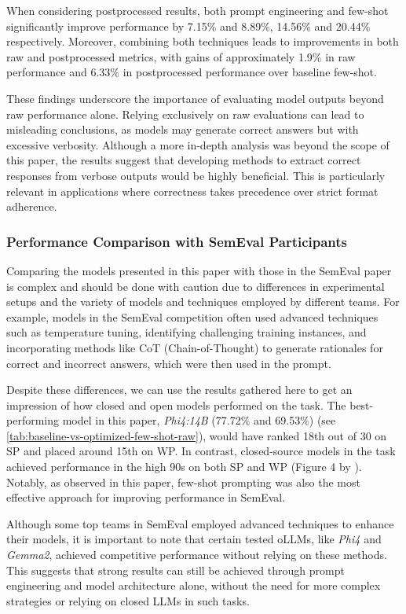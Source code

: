 When considering postprocessed results, both prompt engineering and few-shot significantly improve performance by 7.15\% and 8.89\%, 14.56\% and 20.44\% respectively. Moreover, combining both techniques leads to improvements in both raw and postprocessed metrics, with gains of approximately 1.9\% in raw performance and 6.33\% in postprocessed performance over baseline few-shot.

These findings underscore the importance of evaluating model outputs beyond raw performance alone. Relying exclusively on raw evaluations can lead to misleading conclusions, as models may generate correct answers but with excessive verbosity. Although a more in-depth analysis was beyond the scope of this paper, the results suggest that developing methods to extract correct responses from verbose outputs would be highly beneficial. This is particularly relevant in applications where correctness takes precedence over strict format adherence.

\subsubsection{Performance Comparison with SemEval Participants}

Comparing the models presented in this paper with those in the SemEval paper\cite{jiangSemEval2024Task92024} is complex and should be done with caution due to differences in experimental setups and the variety of models and techniques employed by different teams. For example, models in the SemEval competition often used advanced techniques such as temperature tuning, identifying challenging training instances, and incorporating methods like \ac{CoT} (Chain-of-Thought) to generate rationales for correct and incorrect answers, which were then used in the prompt.

Despite these differences, we can use the results gathered here to get an impression of how closed and open models performed on the task. The best-performing model in this paper, \textit{Phi4:14B} (77.72\% and 69.53\%) (see \cref{tab:baseline-vs-optimized-few-shot-raw}), would have ranked 18th out of 30 on \ac{SP} and placed around 15th on \ac{WP}. In contrast, closed-source models in the task achieved performance in the high 90s on both \ac{SP} and \ac{WP} (Figure 4 by \textcite{jiangSemEval2024Task92024}). Notably, as observed in this paper, few-shot prompting was also the most effective approach for improving performance in SemEval.

Although some top teams in SemEval employed advanced techniques to enhance their models, it is important to note that certain tested \acp{oLLM}, like \textit{Phi4} and \textit{Gemma2}, achieved competitive performance without relying on these methods. This suggests that strong results can still be achieved through prompt engineering and model architecture alone, without the need for more complex strategies or relying on closed \acp{LLM} in such tasks.